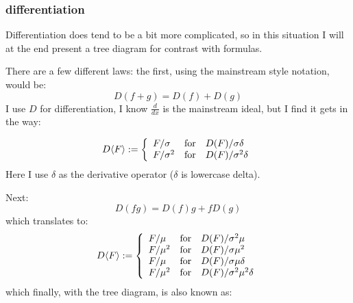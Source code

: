 \documentclass[twoside]{article}
\begin{document}
\subsubsection{differentiation}

Differentiation does tend to be a bit more complicated, so in this situation I will at the end present
a tree diagram for contrast with formulas.

There are a few different laws: the first, using the mainstream style notation, would be:
$$ D(f+g)=D(f)+D(g) $$
I use $ D $ for differentiation, I know $ \frac{d}{dx} $ is the mainstream ideal, but I find it gets in the way:

$$ D\langle F\rangle :=\left\{
\begin{array}{l@{\quad\mbox{for}\quad}l}
 F/\sigma & D(F)/\sigma\delta \\
 F/\sigma^2 & D(F)/\sigma^2\delta
\end{array}\right. $$
Here I use $ \delta $ as the derivative operator ($ \delta $ is lowercase delta).

Next:
$$ D(fg)=D(f)g+fD(g) $$
which translates to:
$$ D\langle F\rangle :=\left\{
\begin{array}{l@{\quad\mbox{for}\quad}l}
 F/\mu & D(F)/\sigma^2\mu \\
 F/\mu^2 & D(F)/\sigma\mu^2 \\
 F/\mu & D(F)/\sigma\mu\delta \\
 F/\mu^2 & D(F)/\sigma^2\mu^2\delta
\end{array}\right. $$
which finally, with the tree diagram, is also known as:
\end{document}
